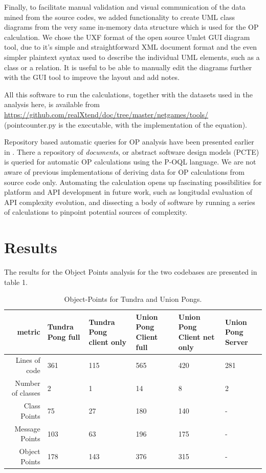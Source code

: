 \documentclass[conference]{IEEEtran}
\begin{document}
Finally, to facilitate manual validation and visual communication of
the data mined from the source codes, we added functionality to create
UML class diagrams from the very same in-memory data structure which
is used for the OP calculation. We chose the UXF format of the open
source Umlet GUI diagram tool, due to it's simple and straightforward
XML document format and the even simpler plaintext syntax used to
describe the individual UML elements, such as a class or a
relation. It is useful to be able to manually edit the diagrams
further with the GUI tool to improve the layout and add notes.

All this software to run the calculations, together with the datasets
used in the analysis here, is available from
\url{https://github.com/realXtend/doc/tree/master/netgames/tools/}
(pointcounter.py is the executable, with the implementation of the
equation).

Repository based automatic queries for OP analysis have been presented
earlier in \cite{henrich97repositorybased}. There a repository of
\emph{documents}, or abstract software design models (PCTE) is queried for
automatic OP calculations using the P-OQL language. We are not aware
of previous implementations of deriving data for OP calculations from
source code only. Automating the calculation opens up fascinating
possibilities for platform and API development in future work, such as
longitudal evaluation of API complexity evolution, and dissecting a
body of software by running a series of calculations to pinpoint
potential sources of complexity.


\section{Results%
  \label{results}%
}

The results for the Object Points analysis for the two codebases are
presented in table 1.

\begin{table}[!t]
\renewcommand{\arraystretch}{1.3}
\caption{Object-Points for Tundra and Union Pongs.}
\label{table_example}
\centering
\begin{tabularx}{\linewidth}{|r|X|X|X|X|X|}
\hline
metric & Tundra Pong full & Tundra Pong client only & Union Pong Client full & Union Pong Client net only & Union Pong Server \\
\hline
Lines of code     & 361 & 115 & 565 & 420 & 281 \\
Number of classes & 2   & 1   & 14  & 8   & 2   \\
Class Points      & 75  & 27  & 180 & 140 & -   \\
Message Points    & 103 & 63  & 196 & 175 & -   \\
Object Points     & 178 & 143 & 376 & 315 & -   \\
\hline
\end{tabularx}
\end{table}
\end{document}
